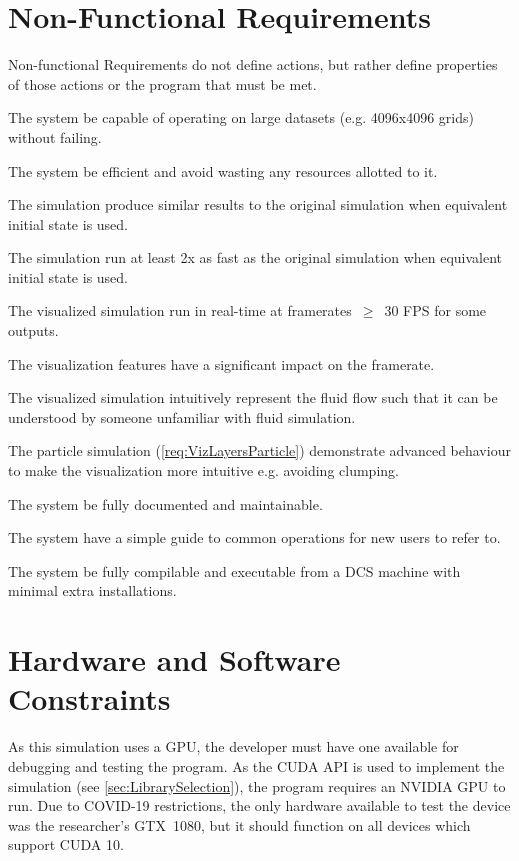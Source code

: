 \section{Non-Functional Requirements}
Non-functional Requirements do not define actions, but rather define properties of those actions or the program that must be met.
\begin{reqNF}
    \item \label{reqN:LargeData} The system \must{} be capable of operating on large datasets (e.g. 4096x4096 grids) without failing.
    \item \label{reqN:Resources} The system \must{} be efficient and avoid wasting any resources allotted to it.
    \item \label{reqN:SimilarOutput} The simulation \must{} produce similar results to the original simulation when equivalent initial state is used.
    \item \label{reqN:SimSpeed} The simulation \should{} run at least 2x as fast as the original simulation when equivalent initial state is used.
    \item \label{reqN:Realtime} The visualized simulation \must{} run in real-time at framerates~$\ge$~30 FPS for some outputs.
    \item \label{reqN:VizSpeed} The visualization features \shouldnt{} have a significant impact on the framerate.
    \item \label{reqN:Intuitive} The visualized simulation \should{} intuitively represent the fluid flow such that it can be understood by someone unfamiliar with fluid simulation.
    \item \label{reqN:VizParticleAdvanced} The particle simulation (\cref{req:VizLayersParticle}) \should{} demonstrate advanced behaviour to make the visualization more intuitive e.g. avoiding clumping.
    \item \label{reqN:Documented} The system \must{} be fully documented and maintainable. %
    \item \label{reqN:UsageGuide} The system \should{} have a simple guide to common operations for new users to refer to.
    \item \label{reqN:DCSCompile} The system \should{} be fully compilable and executable from a DCS machine with minimal extra installations.
\end{reqNF}

\section{Hardware and Software Constraints}
\label{sec:Requirements_HardwareSoftware}
As this simulation uses a GPU, the developer must have one available for debugging and testing the program.
As the CUDA API is used to implement the simulation (see \cref{sec:LibrarySelection}), the program requires an NVIDIA GPU to run.
Due to COVID-19 restrictions, the only hardware available to test the device was the researcher's GTX~1080, but it should function on all devices which support CUDA 10.

